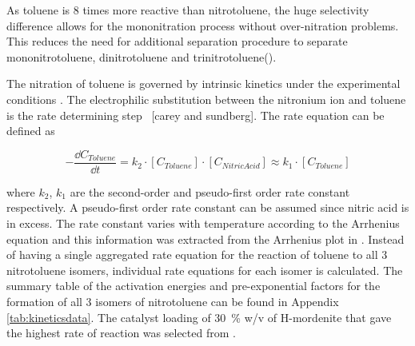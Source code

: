 
As toluene is 8 times more reactive than nitrotoluene, the huge selectivity difference allows for the mononitration process without over-nitration problems. This reduces the need for additional separation procedure to separate mononitrotoluene, dinitrotoluene and trinitrotoluene(). 

The nitration of toluene is governed by intrinsic kinetics under the experimental conditions \cite{jeeru_kinetics_2018}. The electrophilic substitution between the  nitronium ion and toluene is the rate determining step \ [carey and sundberg]. The rate equation can be defined as  

\begin{equation}
-\frac{\dd C_{Toluene}}{\dd t} = k_{2} \cdot [C_{Toluene}] \cdot [C_{Nitric Acid}] \approx k_{1} \cdot [C_{Toluene}]
\end{equation}

where $k_2$, $k_1$ are the second-order and pseudo-first order rate constant respectively. A pseudo-first order rate constant can be assumed since nitric acid is in excess. The rate constant varies with temperature according to the Arrhenius equation and this information was extracted from the Arrhenius plot in \textcite{jeeru_kinetics_2018}. Instead of having a single aggregated rate equation for the reaction of toluene to all 3 nitrotoluene isomers, individual rate equations for each isomer is calculated. The summary table of the activation energies and pre-exponential factors for the formation of all 3 isomers of nitrotoluene can be found in Appendix \ref{tab:kineticsdata}. The catalyst loading of \SI{30}{\%} w/v of H-mordenite that gave the highest rate of reaction was selected from \textcite{jeeru_kinetics_2018}.





